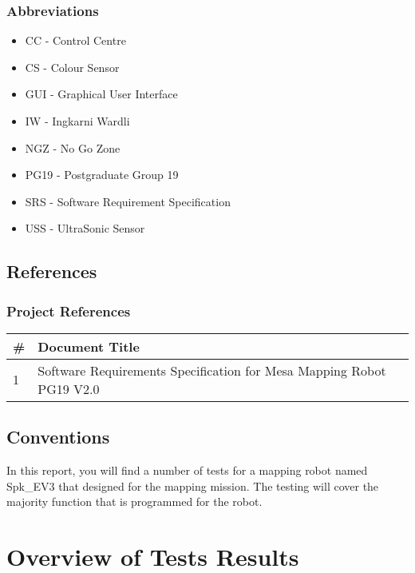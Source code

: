 \documentclass[11pt, a4paper]{article}
\begin{document}
\subsubsection{Abbreviations}
\begin{itemize}
\item {CC - }Control Centre\\
\item {CS - }Colour Sensor\\
\item {GUI - }Graphical User Interface\\
\item {IW - }Ingkarni Wardli\\
\item {NGZ - }No Go Zone\\
\item {PG19 - }Postgraduate Group 19\\
\item {SRS - }Software Requirement Specification\\
\item {USS - }UltraSonic Sensor\\
\end{itemize}

\subsection{References}
\subsubsection{Project References}
\begin{tabular} 
	 {|p{1.2cm}|p{12cm}|}
\hline
{\#} & {Document Title}\\
\hline
{1} & {Software Requirements Specification for Mesa Mapping Robot PG19 V2.0}\\
\hline
\end{tabular}

\subsection{Conventions}
In this report, you will find a number of tests for a mapping robot named Spk\_EV3 that designed for the mapping mission.  The testing will cover the majority function that is programmed for the robot.
\newpage

\section{Overview of Tests Results}
\end{document}

